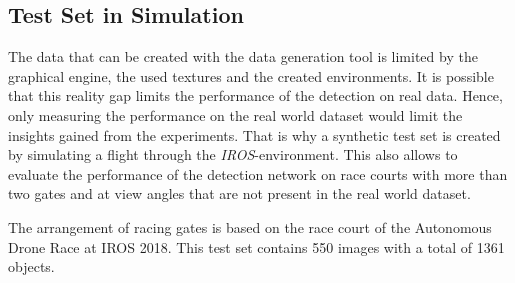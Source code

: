 \subsection{Test Set in Simulation}

The data that can be created with the data generation tool is limited by the graphical engine, the used textures and the created environments. It is possible that this reality gap limits the performance of the detection on real data. Hence, only measuring the performance on the real world dataset would limit the insights gained from the experiments. That is why a synthetic test set is created by simulating a flight through the \textit{IROS}-environment. This also allows to evaluate the performance of the detection network on race courts with more than two gates and at view angles that are not present in the real world dataset.  

The arrangement of racing gates is based on the race court of the Autonomous Drone Race at \ac{IROS} 2018. This test set contains 550 images with a total of 1361 objects.



